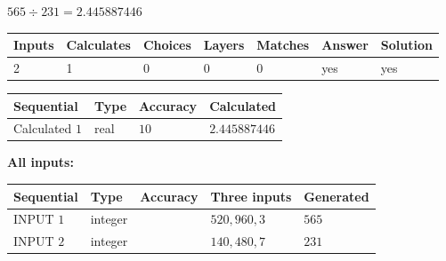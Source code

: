 \documentclass{ctexart}
\begin{document}
 

$ %
565 \div  %
231=   %
2.445887446$
 
 
\noindent{}
 
 

 
   
   
   
   
\noindent\begin{tabular}{|l|l|l|l|l|l|l|}
 \hline
Inputs & Calculates & Choices & Layers & Matches & Answer & Solution \\ \hline
 2  & 
 1  & 
 0
  & 
 0  & 
 0  & 
  yes & 
  yes 
  \\ \hline
 \end{tabular}
   
   
   
   
\noindent{}
   
   
  
  
\noindent\begin{tabular}{|l|l|l|l|}
\hline
 Sequential & Type & Accuracy & Calculated \\ 
\hline
 
 
  Calculated $  1 $ & real & $  10  $ & 
 $ 2.445887446 $ 
 \\  \hline  
 \end{tabular}
   
   
   
   
\noindent\vspace{0.1in}\hspace{-0.08in} {\textbf{\Large{All inputs: }}}
   
   
  
  
\noindent\begin{tabular}{|l|l|l|l|l|}
\hline
 Sequential & Type & Accuracy & Three inputs & Generated \\ 
\hline
 
 
  INPUT $  1 $ & integer &  & $
 520
 , 
 960
 , 
 3
 $ & $ 565 $ 
 \\  \hline  
 
 
  INPUT $  2 $ & integer &  & $
 140
 , 
 480
 , 
 7
 $ & $ 231 $ 
 \\  \hline  
 \end{tabular}
   
   
  
\vspace{0.2in}
  
\end{document}
